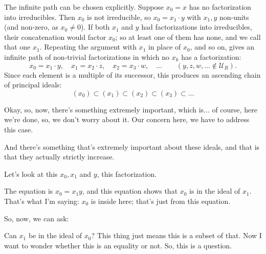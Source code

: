 \begin{proofWrapper}
\begin{content}
\begin{center}
\end{center}

The infinite path can be chosen explicitly. Suppose $x_0 = x$ has no factorization into irreducibles. Then $x_0$ is not irreducible, so $x_0 = x_1 \cdot y$ with $x_1, y$ non-units (and non-zero, as $x_0 \neq 0$). If both $x_1$ and $y$ had factorizations into irreducibles, their concatenation would factor $x_0$; so at least one of them has none, and we call that one $x_1$. Repeating the argument with $x_1$ in place of $x_0$, and so on, gives an infinite path of non-trivial factorizations in which no $x_k$ has a factorization:
\begin{equation}\label{eq:part3-infinite-factorization-chain}
x_0 = x_1 \cdot y, \quad x_1 = x_2 \cdot z, \quad x_2 = x_3 \cdot w, \quad \dots \qquad (y, z, w, \ldots \notin \mathcal{U}_R).
\end{equation}
Since each element is a multiple of its successor, this produces an ascending chain of principal ideals:
\begin{equation}\label{eq:part3-ascending-chain-prelim}
(x_0) \subset (x_1) \subset (x_2) \subset (x_3) \subset \dots
\end{equation}
\end{content}

\begin{speech}[01:06:02 - 01:07:12]
Okay, so, now, there's something extremely important, which is... of course, here we're done, so, we don't worry about it. Our concern here, we have to address this case. 

And there's something that's extremely important about these ideals, and that is that they actually strictly increase.

Let's look at this $x_0, x_1$ and $y$, this factorization. 

The equation is $x_0 = x_1 y$, and this equation shows that $x_0$ is in the ideal of $x_1$. That's what I'm saying: $x_0$ is inside here; that's just from this equation.

So, now, we can ask: 

Can $x_1$ be in the ideal of $x_0$? This thing just means this is a subset of that. Now I want to wonder whether this is an equality or not. So, this is a question.
\end{speech}


\end{proofWrapper}
